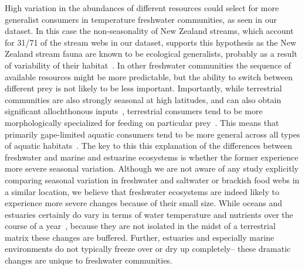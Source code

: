 \documentclass[12pt]{article}
\begin{document}
  High variation in the abundances of different resources could select for more generalist consumers
  in temperature freshwater communities, as seen in our dataset. In this case the non-seasonality of
  New Zealand streams, which account for 31/71 of the stream webs in our dataset, supports this
  hypothesis as the New Zealand stream fauna are known to be ecological generalists,
  probably as a result of variability of their habitat~\cite{Winterbourn1997}. In other freshwater
  communities the sequence of available resources might be more predictable, but the ability to 
  switch between different prey is not likely to be less important. Importantly, while terrestrial
  communities are also strongly seasonal at high latitudes, and can also obtain significant allochthonous
  inputs~\cite{Nakano2001}, terrestrial consumers tend to be more morphologically specialized for
  feeding on particular prey~\cite{Liem1990}. This means that primarily gape-limited aquatic consumers
  tend to be more general across all types of aquatic habitats~\cite{Liem1990,Shurin2006}.
  The key to this this explanation of the differences between freshwater and marine and estuarine 
  ecosystems is whether the former experience more severe seasonal variation. Although we are not
  aware of any study explicitly comparing seasonal variation in freshwater and saltwater or brackish
  food webs in a similar location, we believe that freshwater ecosystems are indeed likely to 
  experience more severe changes because of their small size. While oceans and estuaries certainly
  do vary in terms of water temperature and nutrients over the course of a year~\cite{}, because they
  are not isolated in the midst of a terrestrial matrix these changes are buffered. Further, estuaries
  and especially marine environments do not typically freeze over or dry up completely-- these dramatic
  changes are unique to freshwater communities.
  

\end{document}
